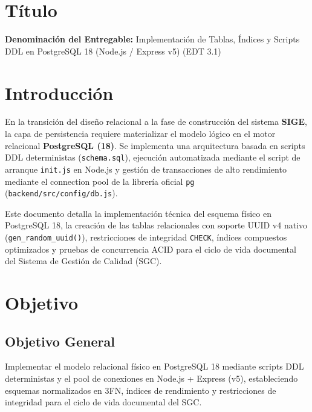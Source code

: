 \documentclass[11pt,a4paper]{article}
\begin{document}
\section{Título}
\textbf{Denominación del Entregable:} Implementación de Tablas, Índices y Scripts DDL en PostgreSQL 18 (Node.js / Express v5) (EDT 3.1)



\section{Introducción}
En la transición del diseño relacional a la fase de construcción del sistema \textbf{SIGE}, la capa de persistencia requiere materializar el modelo lógico en el motor relacional \textbf{PostgreSQL (18)}. Se implementa una arquitectura basada en scripts DDL deterministas (\texttt{schema.sql}), ejecución automatizada mediante el script de arranque \texttt{init.js} en Node.js y gestión de transacciones de alto rendimiento mediante el connection pool de la librería oficial \texttt{pg} (\texttt{backend/src/config/db.js}).

Este documento detalla la implementación técnica del esquema físico en PostgreSQL 18, la creación de las tablas relacionales con soporte UUID v4 nativo (\texttt{gen\_random\_uuid()}), restricciones de integridad \texttt{CHECK}, índices compuestos optimizados y pruebas de concurrencia ACID para el ciclo de vida documental del Sistema de Gestión de Calidad (SGC).

\section{Objetivo}

\subsection{Objetivo General}
Implementar el modelo relacional físico en PostgreSQL 18 mediante scripts DDL deterministas y el pool de conexiones en Node.js + Express (v5), estableciendo esquemas normalizados en 3FN, índices de rendimiento y restricciones de integridad para el ciclo de vida documental del SGC.
\end{document}
